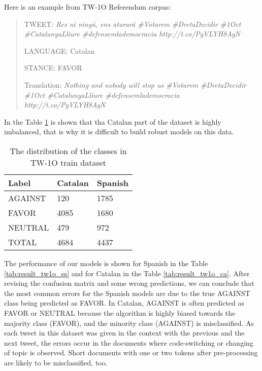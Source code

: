 \documentclass[10pt, a4paper]{article}
\begin{document}
Here is an example from TW-1O Referendum corpus: 

\begin{quote}
TWEET: \textit{Res ni ning\'u, ens aturar\'a \#Votarem \#DretaDecidir \#1Oct \#CatalunyaLliure \#defensemlademocracia http://t.co/PgVLYH8AgN }

LANGUAGE: Catalan 

STANCE: FAVOR

Translation: \textit{Nothing and nobody will stop us \#Votarem \#DretaDecidir \#1Oct \#CatalunyaLliure \#defensemlademocracia http://t.co/PgVLYH8AgN}
\end{quote}

In the Table \ref{tab:twdatasetdistr} is shown that tha Catalan part of the dataset is highly imbalanced, that is why it is difficult to build robust models on this data.  

\begin{table}[h]
\begin{center}
\begin{tabularx}{\columnwidth}{|l|l|X|}

      \hline
      Label&Catalan&Spanish\\
      \hline
    AGAINST & 120&1785\\
      \hline
      FAVOR & 4085&1680\\
      \hline
     NEUTRAL & 479&972\\
      \hline
      TOTAL & 4684&4437\\
      \hline

\end{tabularx}
\caption{The distribution of the classes in TW-1O train dataset}
 \end{center}
 \label{tab:twdatasetdistr}
\end{table}

The performance of our models is shown for Spanish in the Table \ref{tab:result_tw1o_es} and for Catalan in the Table \ref{tab:result_tw1o_ca}. After revising the confusion matrix and some wrong predictions, we can conclude that the most common errors for the Spanish models are due to the true AGAINST class being predicted as FAVOR. In Catalan, AGAINST is often predicted as FAVOR or NEUTRAL because the algorithm is highly biased towards the majority class (FAVOR), and the minority class (AGAINST) is misclassified. As each tweet in this dataset was given in the context with the previous and the next tweet, the errors occur in the documents where code-switching or changing of topic is observed. Short documents with one or two tokens after pre-processing are likely to be misclassified, too. 
\end{document}
